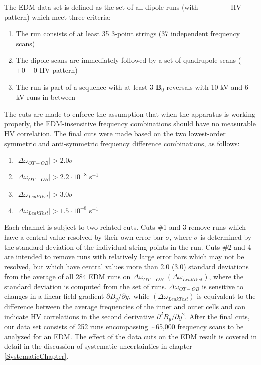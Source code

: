 \documentclass [10pt, twoside] {uwthesis}[2012/04/02]
\begin{document}
The EDM data set is defined as the set of all dipole runs (with $+-+-$ HV pattern) which meet three criteria:
\begin{enumerate}
\item The run consists of at least 35 3-point strings (37 independent frequency scans)
\item The dipole scans are immediately followed by a set of quadrupole scans ($+0-0$ HV pattern)
\item The run is part of a sequence with at least 3 $\mathbf{B}_0$ reversals with 10 kV and 6 kV runs in between
\end{enumerate}
The cuts are made to enforce the assumption that when the apparatus is working properly, the EDM-insensitive frequency combinations should have no measurable HV correlation. The final cuts were made based on the two lowest-order symmetric and anti-symmetric frequency difference combinations, as follows: 
\begin{enumerate}
\item $|\Delta\omega_{OT-OB}| > 2.0 \sigma$ 
\item $|\Delta\omega_{OT-OB}| > 2.2 \cdot 10^{-8}$ s$^{-1}$
\item $|\Delta\omega_{Leak Test}| > 3.0 \sigma$ 
\item $|\Delta\omega_{Leak Test}| > 1.5 \cdot 10^{-8}$ s$^{-1}$ 
\end{enumerate}

Each channel is subject to two related cuts. Cuts \#1 and 3 remove runs which have a central value resolved by their own error bar $\sigma$, where $\sigma$ is determined by the standard deviation of the individual string points in the run. Cuts \#2 and 4 are intended to remove runs with relatively large error bars which may not be resolved, but which have central values more than 2.0 (3.0) standard deviations from the average of all 284 EDM runs on $\Delta\omega_{OT-OB}$ $(\Delta\omega_{Leak Test})$, where the standard deviation is computed from the set of runs. $\Delta\omega_{OT-OB}$ is sensitive to changes in a linear field gradient $\partial B_y/\partial y$, while $(\Delta\omega_{Leak Test})$ is equivalent to the difference between the average frequencies of the inner and outer cells and can indicate HV correlations in the second derivative $\partial^2B_y/\partial y^2.$ After the final cuts, our data set consists of 252 runs encompassing $\sim$65,000 frequency scans to be analyzed for an EDM. The effect of the data cuts on the EDM result is covered in detail in the discussion of systematic uncertainties in chapter \ref{SystematicChapter}.
\end{document}
